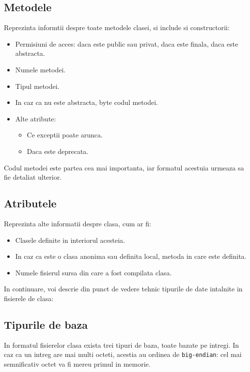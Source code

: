\subsection{Metodele}\label{metodele}

Reprezinta informtii despre toate metodele clasei, si include si
constructorii:

\begin{itemize}
    \item Permisiuni de acces: daca este public sau privat, daca este finala, daca este abstracta.
    \item Numele metodei.
    \item Tipul metodei.
    \item In caz ca nu este abstracta, byte codul metodei.
    \item Alte atribute:
        \begin{itemize}
            \item Ce exceptii poate arunca.
            \item Daca este deprecata.
        \end{itemize}
\end{itemize}

Codul metodei este partea cea mai importanta, iar formatul acestuia
urmeaza sa fie detaliat ulterior.

\subsection{Atributele}

Reprezinta alte informatii despre clasa, cum ar fi:
\begin{itemize}
    \item Clasele definite in interiorul acesteia.
    \item In caz ca este o clasa anonima sau definita local, metoda in care este definita.
    \item Numele fisierul sursa din care a fost compilata clasa.
\end{itemize}

In continuare, voi descrie din punct de vedere tehnic tipurile de date
intalnite in fisierele de clasa:

\subsection{Tipurile de baza}

In formatul fisierelor clasa exista trei tipuri de baza, toate bazate pe
intregi. In caz ca un intreg are mai multi octeti, acestia au ordinea de
\texttt{big-endian}: cel mai semnificativ octet va fi mereu primul in
memorie.

